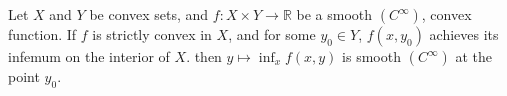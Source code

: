 \begin{lproof}

\end{lproof}

\begin{lemma}\label{lem:cvx4}
	Let $X$ and $Y$ be convex sets, and
	$f : X \times Y \to \mathbb R$ be a smooth $(C^\infty)$, convex function.
	If $f$ is strictly convex in $X$, and for some $y_0 \in Y$, $f(x, y_0)$ achieves its infemum on the interior of $X$.
	then $y \mapsto \inf_x f(x, y)$ is smooth $(C^\infty)$ at the point $y_0$.
\end{lemma}

